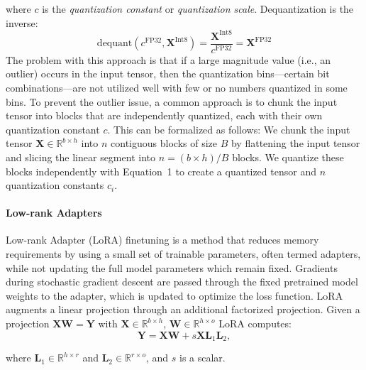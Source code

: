 \noindent
where $c$ is the {\em quantization constant} or {\em quantization scale}. Dequantization is the inverse:
\begin{equation}
    \text{dequant}(c^{\text{FP32}}, \mathbf{X}^{\text{Int8}}) = \frac{\mathbf{X}^{\text{Int8}}}{c^{\text{FP32}}} = \mathbf{X}^{\text{FP32}}
\end{equation}
The problem with this approach is that if a large magnitude value (i.e., an outlier) occurs in the input tensor, then the quantization bins—certain bit combinations—are not utilized well with few or no numbers quantized in some bins. To prevent the outlier issue, a common approach is to chunk the input tensor into blocks that are independently quantized, each with their own quantization constant $c$. This can be formalized as follows: We chunk the input tensor  $\mathbf{X}\in \mathbb{R}^{b\times h}$ into $n$ contiguous blocks of size $B$ by flattening the input tensor and slicing the linear segment into ${n = ({b\times h}
)/{B} }$ blocks. We quantize these blocks independently with Equation~1 to create a quantized tensor and $n$ quantization constants $c_i$.

\paragraph{Low-rank Adapters} Low-rank Adapter (LoRA) finetuning \citep{hu2021lora} is a method that reduces memory requirements by using a small set of trainable parameters, often termed adapters, while not updating the full model parameters which remain fixed. Gradients during stochastic gradient descent are passed through the fixed pretrained model weights to the adapter, which is updated to optimize the loss function. LoRA augments a linear projection through an additional factorized projection. Given a projection ${\mathbf{X} \mathbf{W} = \mathbf{Y}}$ with $\mathbf{X}\in  \mathbb{R}^{b\times h}$, $\mathbf{W}\in  \mathbb{R}^{h\times o}$ LoRA computes:
\begin{equation}
    \mathbf{Y} = \mathbf{X}\mathbf{W} + s\mathbf{X}\mathbf{L}_1\mathbf{L}_2,
\end{equation}

\noindent
where $\mathbf{L}_1\in  \mathbb{R}^{h\times r}$ and $\mathbf{L}_2\in  \mathbb{R}^{r\times o}$, and $s$ is a scalar.

